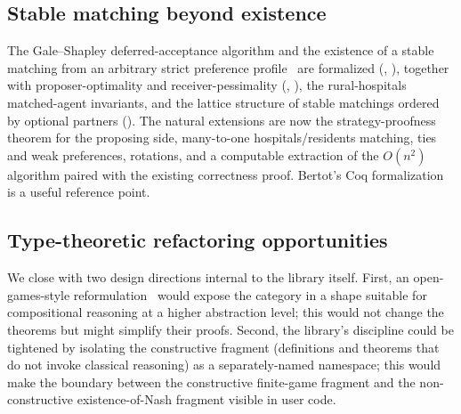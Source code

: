 \subsection{Stable matching beyond existence}
\label{sec:future:matching}

The Gale–Shapley deferred-acceptance algorithm and the existence of a
stable matching from an arbitrary strict preference
profile~\citep{GaleShapley1962} are formalized
(, ), together
with proposer-optimality and receiver-pessimality
(, ), the
rural-hospitals matched-agent invariants, and the lattice structure of
stable matchings ordered by optional partners
().  The natural
extensions are now the strategy-proofness theorem for the proposing
side, many-to-one hospitals/residents matching, ties and weak
preferences, rotations, and a computable extraction of the $O(n^2)$
algorithm paired with the existing correctness proof.  Bertot's Coq
formalization \citep{Bertot2016} is a useful reference point.

\subsection{Type-theoretic refactoring opportunities}
\label{sec:future:refactor}

We close with two design directions internal to the library
itself.  First, an open-games-style
reformulation~\citep{GhaniHedgesWinschelZahn2018} would expose the
 category in a shape suitable for compositional
reasoning at a higher abstraction level; this would not change
the theorems but might simplify their proofs.  Second, the
library's  discipline could be tightened by
isolating the constructive fragment (definitions and theorems
that do not invoke classical reasoning) as a separately-named
namespace; this would make the boundary between the constructive
finite-game fragment and the non-constructive existence-of-Nash
fragment visible in user code.
